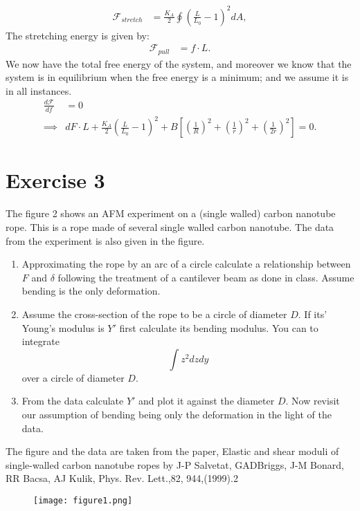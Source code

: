 \documentclass[a4paper]{article}
\begin{document}
\begin{align*}
    \mathcal{F}_{stretch} &= \frac{K_A}{2}\oint\left(\frac{L}{L_0} - 1\right)^2dA,
\end{align*}The stretching energy is given by:
\begin{align*}
    \mathcal{F}_{pull} &= f\cdot L.
\end{align*}We now have the total free energy of the system, and moreover we know that the system is in equilibrium when the free energy is a minimum; and we assume it is in all instances.
\begin{align*}
    \frac{d\mathcal{F}}{df} &= 0 \\
    \implies& dF\cdot L + \frac{K_A}{2}\left(\frac{L}{L_0} - 1\right)^2 + B \left[\left(\frac{1}{R}\right)^2 + \left(\frac{1}{r}\right)^2 + \left(\frac{1}{2r}\right)^2\right] = 0.
\end{align*}


\section*{Exercise 3}
The figure 2 shows an AFM experiment on a (single walled) carbon nanotube rope.
This is a rope made of several single walled carbon nanotube. The data from the experiment is also given in the figure.
\begin{enumerate}
    \item Approximating the rope by an arc of a circle calculate a relationship between $F$ and $\delta$ following the treatment of a cantilever beam as done in class.  Assume bending is the only deformation.
    \item Assume the cross-section of the rope to be a circle of diameter $D$. If its' Young's modulus is $Y'$ first calculate its bending modulus. You can to integrate $$\int z^2 dzdy$$ over a circle of diameter $D$.
    \item From the data calculate $Y'$ and plot it against the diameter $D$. Now revisit our assumption of bending being only the deformation in the light of the data.
\end{enumerate}
The figure and the data are taken from the paper, Elastic and shear moduli of single-walled carbon nanotube ropes by J-P Salvetat, GADBriggs, J-M Bonard, RR Bacsa, AJ Kulik, Phys. Rev. Lett.,82, 944,(1999).2

\begin{figure}[H]
    \centering
    \texttt{[image: figure1.png]}
\end{figure}
\end{document}
